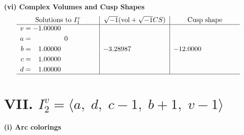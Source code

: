 \documentclass[1p]{elsarticle_modified}
\theoremstyle{definition}
\newcommand{\I}{\sqrt{-1}}
\begin{document}
\newpage\flushleft \textbf{(vi) Complex Volumes and Cusp Shapes}
$$\begin{array}{c|c|c}  
\text{Solutions to }I^v_{1}& \I (\text{vol} + \sqrt{-1}CS) & \text{Cusp shape}\\
 \hline 
\begin{aligned}
v &= -1.00000\phantom{ +0.000000I} \\
a &= \phantom{-0.000000 } 0 \\
b &= \phantom{-}1.00000\phantom{ +0.000000I} \\
c &= \phantom{-}1.00000\phantom{ +0.000000I} \\
d &= \phantom{-}1.00000\phantom{ +0.000000I}\end{aligned}
 & -3.28987\phantom{ +0.000000I} & -12.0000\phantom{ +0.000000I}\\
 \hline 
 \end{array}$$\newpage\newpage\renewcommand{\arraystretch}{1}
\centering \section*{VII. $I^v_{2}= \langle a,\;d,\;c-1,\;b+1,\;v-1 \rangle$}
\flushleft \textbf{(i) Arc colorings}\\
\end{document}
